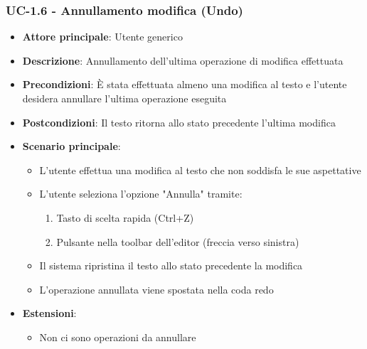 \documentclass[11pt,a4paper]{article}
\begin{document}
\subsubsection{UC-1.6 - Annullamento modifica (Undo)}
\begin{itemize}
    \item \textbf{Attore principale}: Utente generico
    \item \textbf{Descrizione}: Annullamento dell'ultima operazione di modifica effettuata
    \item \textbf{Precondizioni}: È stata effettuata almeno una modifica al testo e l'utente desidera annullare l'ultima operazione eseguita
    \item \textbf{Postcondizioni}: Il testo ritorna allo stato precedente l'ultima modifica
    \item \textbf{Scenario principale}:
        \begin{itemize}
            \item L'utente effettua una modifica al testo che non soddisfa le sue aspettative
            \item L'utente seleziona l'opzione "Annulla" tramite:
                \begin{enumerate}
                    \item Tasto di scelta rapida (Ctrl+Z)
                    \item Pulsante nella toolbar dell'editor (freccia verso sinistra)
                \end{enumerate}
            \item Il sistema ripristina il testo allo stato precedente la modifica
            \item L'operazione annullata viene spostata nella coda redo
        \end{itemize}
    \item \textbf{Estensioni}:
        \begin{itemize}
            \item Non ci sono operazioni da annullare
        \end{itemize}
\end{itemize}
\end{document}
